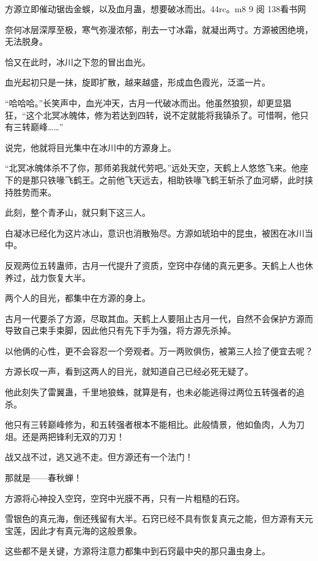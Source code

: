 
\begin{this_body}

方源立即催动锯齿金蜈，以及血月蛊，想要破冰而出。44rc。m8 9 阅 138看书网

奈何冰层深厚至极，寒气弥漫浓郁，削去一寸冰霜，就凝出两寸。方源被困绝境，无法脱身。

恰又在此时，冰川之下忽的冒出血光。

血光起初只是一抹，旋即扩散，越来越盛，形成血色霞光，泛滥一片。

“哈哈哈。”长笑声中，血光冲天，古月一代破冰而出。他虽然狼狈，却更显猖狂，“这个北冥冰魄体，修为若达到四转，说不定就能将我镇杀了。可惜啊，他只有三转巅峰……”

说完，他就将目光集中在冰川中的方源身上。

“北冥冰魄体杀不了你，那师弟我就代劳吧。”远处天空，天鹤上人悠悠飞来。他座下的是那只铁喙飞鹤王。之前他飞天远去，相助铁喙飞鹤王斩杀了血河蟒，此时挟持胜势而来。

此刻，整个青矛山，就只剩下这三人。

白凝冰已经化为这片冰山，意识也消散殆尽。方源如琥珀中的昆虫，被困在冰川当中。

反观两位五转蛊师，古月一代提升了资质，空窍中存储的真元更多。天鹤上人也休养过，战力恢复大半。

两个人的目光，都集中在方源的身上。

古月一代要杀了方源，尽取其血。天鹤上人要阻止古月一代，自然不会保护方源而导致自己束手束脚，因此他只有先下手为强，将方源先杀掉。

以他俩的心性，更不会容忍一个旁观者。万一两败俱伤，被第三人捡了便宜去呢？

方源长叹一声，看到这两人的目光，就知道自己已经必死无疑了。

他此刻失了雷翼蛊，千里地狼蛛，就算是有，也未必能逃得过两位五转强者的追杀。

他只有三转巅峰修为，和五转强者根本不能相比。此般情景，他如鱼肉，人为刀俎。还是两把锋利无双的刀刃！

战又战不过，逃又逃不走。但方源还有一个法门！

那就是——春秋蝉！

方源将心神投入空窍，空窍中光膜不再，只有一片粗糙的石窍。

雪银色的真元海，倒还残留有大半。石窍已经不具有恢复真元之能，但方源有天元宝莲，因此才有真元海的这般景象。

这些都不是关键，方源将注意力都集中到石窍最中央的那只蛊虫身上。


\end{this_body}

